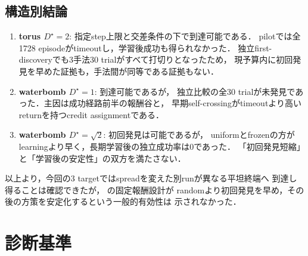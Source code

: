 \documentclass[a4paper,11pt]{ltjsarticle}
\newcommand{\Code}[1]{\texttt{\detokenize{#1}}}
\begin{document}
\subsection{構造別結論}

\begin{enumerate}
  \item \textbf{torus $D^\star=2$}: 指定step上限と交差条件の下で到達可能である．
  pilotでは全1728 episodeがtimeoutし，学習後成功も得られなかった．
  独立first-discoveryでも3手法30 trialがすべて打切りとなったため，
  現予算内に初回発見を早めた証拠も，手法間が同等である証拠もない．
  \item \textbf{waterbomb $D^\star=1$}: 到達可能であるが，
  独立比較の全30 trialが未発見であった．主因は成功経路前半の報酬谷と，
  早期self-crossingがtimeoutより高いreturnを持つcredit assignmentである．
  \item \textbf{waterbomb $D^\star=\sqrt2$}: 初回発見は可能であるが，
  uniformとfrozenの方がlearningより早く，長期学習後の独立成功率は0であった．
  「初回発見短縮」と「学習後の安定性」の双方を満たさない．
\end{enumerate}

以上より，今回の3 targetではspreadを変えた別runが異なる平坦終端へ
到達し得ることは確認できたが，\Code{ori_codex4} の固定報酬設計が
randomより初回発見を早め，その後の方策を安定化するという一般的有効性は
示されなかった．

\section{診断基準}
\end{document}
